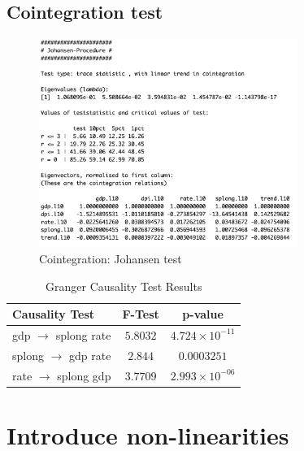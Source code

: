 \documentclass[hidelinks,12pts]{article}
\DeclareMathOperator{\1}{\mathbbm{1}}
\begin{document}
\subsection{Cointegration test}

\begin{figure}[h!]
    \centering
    \includegraphics*[width=0.75\textwidth]{IMAGES/coint_test.png}
    \caption{Cointegration: Johansen test}
\end{figure}





\begin{table}[htbp]
    \centering
    \caption{Granger Causality Test Results}
    \begin{tabular}{|l|c|c|}
    \toprule
    \textbf{Causality Test} & \textbf{F-Test} & \textbf{p-value} \\
    \midrule
    gdp $\rightarrow$ splong rate & $5.8032$ & $4.724 \times 10^{-11}$ \\
    splong $\rightarrow$ gdp rate & $2.844$ & $0.0003251$ \\
    rate $\rightarrow$ splong gdp & $3.7709$ & $2.993 \times 10^{-06}$ \\
    \bottomrule
    \end{tabular}
    \label{tab:granger_results}
\end{table}












\newpage
\section{Introduce non-linearities}\label{sec:nonlinearities}
\end{document}
